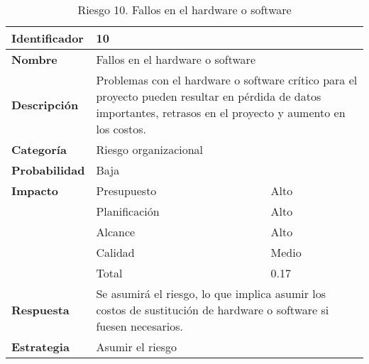 \begin{table}[H]
    \centering
    \caption{Riesgo 10. Fallos en el hardware o software}
    \label{table:risk_hardware}
    \begin{tabular}{>{\columncolor{lightgreen!20}}l l l}
    \toprule
    \rowcolor{lightgreen}
    \textbf{Identificador} & \multicolumn{2}{l}{10} \\
    \midrule
    \textbf{Nombre} & \multicolumn{2}{l}{Fallos en el hardware o software} \\
    \midrule
    \textbf{Descripción} & \multicolumn{2}{p{10cm}}{Problemas con el hardware o software crítico para el proyecto pueden resultar en pérdida de datos importantes, retrasos en el proyecto y aumento en los costos.} \\
    \midrule
    \textbf{Categoría} & \multicolumn{2}{l}{Riesgo organizacional} \\
    \midrule
    \textbf{Probabilidad} & \multicolumn{2}{l}{Baja} \\
    \midrule
    \textbf{Impacto} & Presupuesto & Alto \\
    \cmidrule(lr){2-3}
    & Planificación & Alto \\
    \cmidrule(lr){2-3}
    & Alcance & Alto \\
    \cmidrule(lr){2-3}
    & Calidad & Medio \\
    \cmidrule(lr){2-3}
    & Total & 0.17 \\
    \midrule
    \textbf{Respuesta} & \multicolumn{2}{p{10cm}}{Se asumirá el riesgo, lo que implica asumir los costos de sustitución de hardware o software si fuesen necesarios.} \\
    \midrule
    \textbf{Estrategia} & \multicolumn{2}{l}{Asumir el riesgo} \\
    \bottomrule
    \end{tabular}
\end{table}



